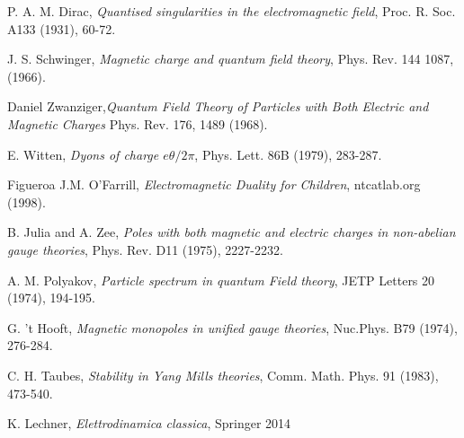 \clearpage
{}
{}


\begin{thebibliography}{99}


P. A. M. Dirac,
\emph{Quantised singularities in the electromagnetic field}, Proc. R. Soc. A133 (1931), 60-72.

J. S. Schwinger, \emph{Magnetic charge and quantum field theory}, Phys. Rev. 144 1087, (1966).

Daniel Zwanziger,\emph{Quantum Field Theory of Particles with Both Electric and Magnetic Charges} Phys. Rev. 176, 1489 (1968).

E. Witten,
\emph{Dyons of charge $e\theta/2\pi$}, Phys. Lett. 86B (1979), 283-287.

Figueroa J.M. O'Farrill, \emph{Electromagnetic Duality for Children}, ntcatlab.org
(1998).

B. Julia and A. Zee, \emph{Poles with both magnetic and electric charges
in non-abelian gauge theories}, Phys. Rev. D11 (1975), 2227-2232.

A. M. Polyakov, \emph{Particle spectrum in quantum Field theory}, JETP Letters 20 (1974), 194-195.

G. 't Hooft, \emph{Magnetic monopoles in unified gauge theories}, Nuc.Phys. B79 (1974), 276-284.

C. H. Taubes, \emph{Stability in Yang Mills theories}, Comm. Math.
Phys. 91 (1983), 473-540.

K. Lechner, \emph{Elettrodinamica classica}, Springer 2014

\end{thebibliography}